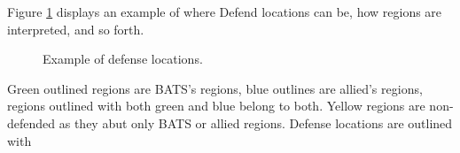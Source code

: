 Figure \ref{fig:defense_locations} displays an example of where Defend locations can be, how regions are interpreted, and so forth.

\begin{figure}[htb]
\centering
\caption{Example of defense locations.}
\label{fig:defense_locations}
\end{figure}

Green outlined regions are BATS’s regions, blue outlines are allied’s regions, regions outlined with both green and blue belong to both. Yellow regions are non-defended as they abut only BATS or allied regions. Defense locations are outlined with
